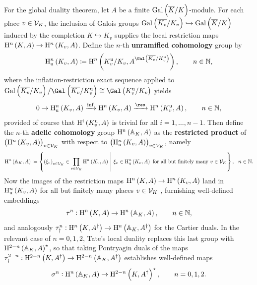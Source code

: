 For the global duality theorem, let $ A $ be a finite $ \AG{K} $-module. For each place $ v \in \mathcal{V}_K $, the inclusion of Galois groups $ \AG{K_v} \hookrightarrow \AG{K} $ induced by the completion $ K \hookrightarrow K_v $ supplies the local restriction maps $ \H^n\br{K, A} \to \H^n\br{K_v, A} $. Define the $ n $-th \textbf{unramified cohomology} group by
$$ \H_\u^n\br{K_v, A} \coloneqq \H^n\br{K_v^\u / K_v, A^{\Gal\br{\overline{K_v} / K_v^\u}}}, \qquad n \in \NN, $$
where the inflation-restriction exact sequence applied to $ \AG{K_v} / \Gal\br{\overline{K_v} / K_v^\u} \cong \Gal\br{K_v^\u / K_v} $ yields
$$ 0 \to \H_\u^n\br{K_v, A} \xrightarrow{\inf} \H^n\br{K_v, A} \xrightarrow{\res} \H^n\br{K_v^\u, A}, \qquad n \in \NN, $$
provided of course that $ \H^i\br{K_v^\u, A} $ is trivial for all $ i = 1, \dots, n - 1 $. Then define the $ n $-th \textbf{adelic cohomology} group $ \H^n\br{\AA_K, A} $ as the \textbf{restricted product} of $ \br{\H^n\br{K_v, A}}_{v \in \VVV_K} $ with respect to $ \br{\H_\u^n\br{K_v, A}}_{v \in \VVV_K} $, namely
$$ \H^n\br{\AA_K, A} \coloneqq \cbr{\br{\xi_v}_{v \in \VVV_K} \in \PV\H^n\br{K_v, A} \st \xi_v \in \H_\u^n\br{K_v, A} \ \text{for all but finitely many} \ v \in \VVV_K}, \ \ n \in \NN. $$
Now the images of the restriction maps $ \H^n\br{K, A} \to \H^n\br{K_v, A} $ land in $ \H_\u^n\br{K_v, A} $ for all but finitely many places $ v \in \mathcal{V}_K $ \cite[Lemma I.4.8]{Mil06}, furnishing well-defined embeddings
$$ \tau^n : \H^n\br{K, A} \to \H^n\br{\AA_K, A}, \qquad n \in \NN, $$
and analogously $ \tau_\dagger^n : \H^n\br{K, A^\dagger} \to \H^n\br{\AA_K, A^\dagger} $ for the Cartier duals. In the relevant case of $ n = 0, 1, 2 $, Tate's local duality replaces this last group with $ \H^{2 - n}\br{\AA_K, A}^\star $, so that taking Pontryagin duals of the maps $ \tau_\dagger^{2 - n} : \H^{2 - n}\br{K, A^\dagger} \to \H^{2 - n}\br{\AA_K, A^\dagger} $ establishes well-defined maps
$$ \sigma^n : \H^n\br{\AA_K, A} \to \H^{2 - n}\br{K, A^\dagger}^\star, \qquad n = 0, 1, 2. $$

\pagebreak

